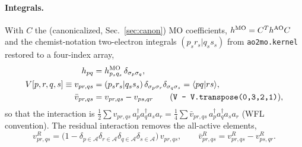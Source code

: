 \documentclass[11pt,a4paper]{article}
\newcommand{\braket}[1]{\langle#1\rangle}
\newcommand{\code}[1]{\texttt{#1}}
\newcommand{\vR}{v^{R}}
\newcommand{\vbR}{\bar v^{R}}
\begin{document}
\paragraph{Integrals.}
With $C$ the (canonicalized, Sec.~\ref{sec:canon}) MO coefficients,
$h^{\rm MO}=C^{T}h^{\rm AO}C$ and the chemist-notation two-electron integrals
$(p_sr_s|q_ss_s)$ from \code{ao2mo.kernel} restored to a four-index array,
\begin{align}
  h_{pq}&=h^{\rm MO}_{p_sq_s}\,\delta_{\sigma_p\sigma_q},
  \label{eq:h-so}\\
  V[p,r,q,s]\equiv v_{pr,qs}&=(p_sr_s|q_ss_s)\,\delta_{\sigma_p\sigma_r}\delta_{\sigma_q\sigma_s}
  =\braket{pq|rs},
  \label{eq:V-so}\\
  \bar v_{pr,qs}&=v_{pr,qs}-v_{ps,qr}
  \qquad(\code{V - V.transpose(0,3,2,1)}),
  \label{eq:vbar}
\end{align}
so that the interaction is $\tfrac12\sum v_{pr,qs}\,a_p^\dagger a_q^\dagger a_sa_r
=\tfrac14\sum\bar v_{pr,qs}\,a_p^\dagger a_q^\dagger a_sa_r$ (WFL
convention).  The residual interaction removes the all-active elements,
\begin{equation}
  \vR_{pr,qs}=\bigl(1-\delta_{p\in\mathcal A}\delta_{r\in\mathcal A}\delta_{q\in\mathcal A}\delta_{s\in\mathcal A}\bigr)\,v_{pr,qs},
  \qquad
  \vbR_{pr,qs}=\vR_{pr,qs}-\vR_{ps,qr}.
  \label{eq:vR}
\end{equation}
\end{document}
